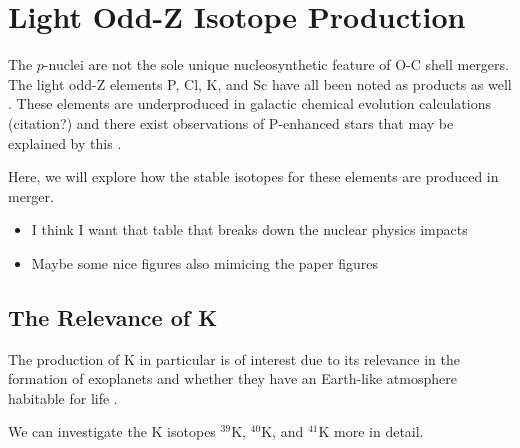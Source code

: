 \section{Light Odd-Z Isotope Production}

The $p$-nuclei are not the sole unique nucleosynthetic feature of O-C shell mergers.
The light odd-Z elements P, Cl, K, and Sc have all been noted as products as well  \cite{ritterConvectivereactiveNucleosynthesisSc2018, robertiOccurrenceImpactCarbonOxygen2025}.
These elements are underproduced in galactic chemical evolution calculations (citation?) and there exist observations of P-enhanced stars that may be explained by this \cite{masseronPhosphorusrichStarsUnusual2020, braunerUnveilingChemicalFingerprint2023, braunerUnveilingChemicalFingerprint2024}.

Here, we will explore how the stable isotopes for these elements are produced in merger.

\begin{itemize}
    \item I think I want that table that breaks down the nuclear physics impacts 
    \item Maybe some nice figures also mimicing the paper figures
\end{itemize}

\subsection{The Relevance of K}

The production of K in particular is of interest due to its relevance in the formation of exoplanets and whether they have an Earth-like atmosphere habitable for life \cite{frankRadiogenicHeatingEvolution2014, oneillEffectGalacticChemical2020}.

We can investigate the K isotopes $^{39}\mathrm{K}$, $^{40}\mathrm{K}$, and $^{41}\mathrm{K}$ more in detail.
